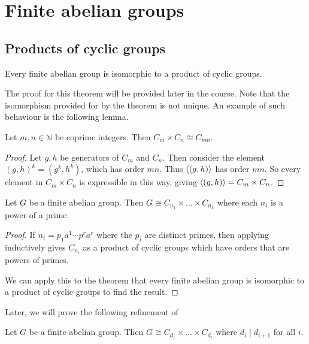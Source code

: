 \section{Finite abelian groups}

\subsection{Products of cyclic groups}
\begin{theorem} \label{thm:6.1}
	Every finite abelian group is isomorphic to a product of cyclic groups.
\end{theorem}

The proof for this theorem will be provided later in the course.
Note that the isomorphism provided for by the theorem is not unique.
An example of such behaviour is the following lemma.

\begin{lemma} \label{lem:6.2}
	Let $m, n \in \mathbb{N}$ be coprime integers.
	Then $C_m \times C_n \cong C_{mn}$.
\end{lemma}

\begin{proof}
	Let $g, h$ be generators of $C_m$ and $C_n$.
	Then consider the element $(g, h)^k = (g^k, h^k)$, which has order $mn$.
	Thus $\left\langle{} (g,h) \right\rangle$ has order $mn$.
	So every element in $C_m \times C_n$ is expressible in this way, giving $\left\langle{} (g,h) \right\rangle = C_m \times C_n$.
\end{proof}

\begin{corollary} \label{cor:6.3}
	Let $G$ be a finite abelian group.
	Then $G \cong C_{n_1} \times \dots \times C_{n_k}$ where each $n_i$ is a power of a prime.
\end{corollary}

\begin{proof}
	If $n_i = p_1 a^1 \cdots p^r a^r$ where the $p_i$ are distinct primes, then applying  inductively gives $C_{n_i}$ as a product of cyclic groups which have orders that are powers of primes.

	We can apply this to the theorem that every finite abelian group is isomorphic to a product of cyclic groups to find the result.
\end{proof}

Later, we will prove the following refinement of 
\begin{theorem} \label{thm:6.4}
	Let $G$ be a finite abelian group.
	Then $G \cong C_{d_1} \times \dots \times C_{d_t}$ where $d_i \mid d_{i+1}$ for all $i$.
\end{theorem}

